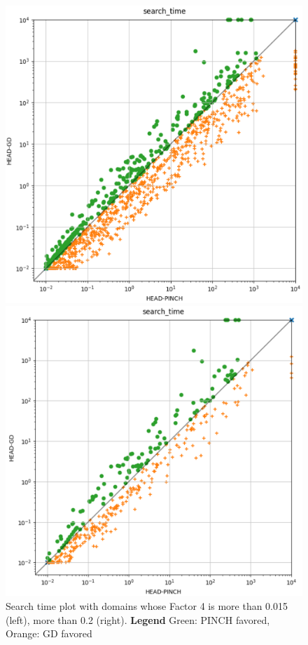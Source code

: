 \begin{figure}[h]
  \centering
  \begin{minipage}[b]{0.40\textwidth}
    \includegraphics[width=\textwidth]{VAROP15.PNG}
  \end{minipage}
  \hfill
  \begin{minipage}[b]{0.40\textwidth}
    \includegraphics[width=\textwidth]{VAROP2.PNG}
    \caption{Search time plot with domains whose Factor 4 is more than 0.015 (left), more than 0.2 (right). \textbf{Legend} Green: PINCH favored, Orange: GD favored}
  \end{minipage}
\end{figure}
